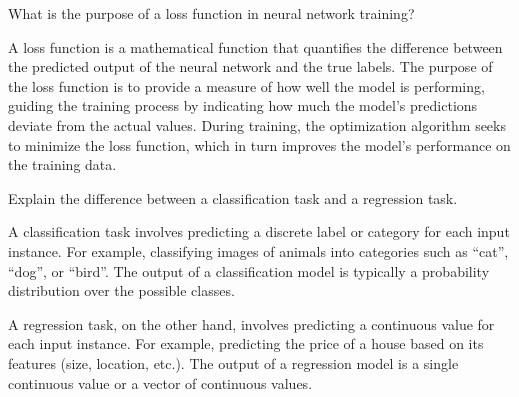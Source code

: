\begin{ejercicio}
    What is the purpose of a loss function in neural network training?

    A loss function is a mathematical function that quantifies the difference between the predicted output of the neural network and the true labels. The purpose of the loss function is to provide a measure of how well the model is performing, guiding the training process by indicating how much the model's predictions deviate from the actual values. During training, the optimization algorithm seeks to minimize the loss function, which in turn improves the model's performance on the training data.
\end{ejercicio}

\begin{ejercicio}
    Explain the difference between a classification task and a regression task.

    A classification task involves predicting a discrete label or category for each input instance. For example, classifying images of animals into categories such as ``cat'', ``dog'', or ``bird''. The output of a classification model is typically a probability distribution over the possible classes.

    A regression task, on the other hand, involves predicting a continuous value for each input instance. For example, predicting the price of a house based on its features (size, location, etc.). The output of a regression model is a single continuous value or a vector of continuous values.
\end{ejercicio}

